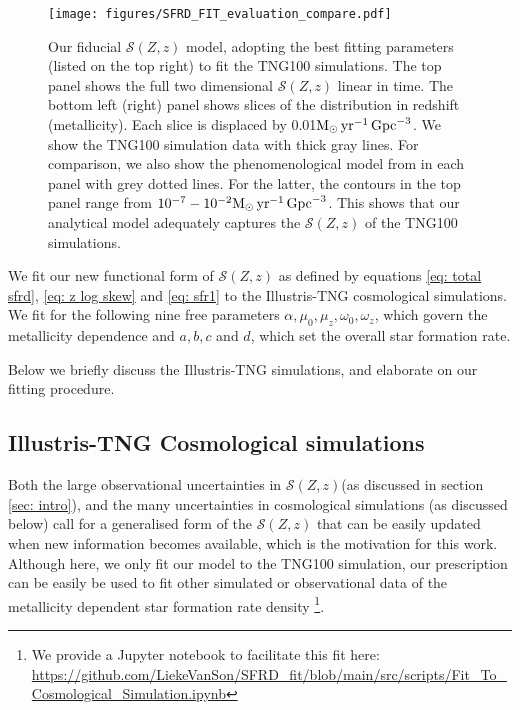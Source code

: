 \documentclass[twocolumn]{aastex631}
\newcommand{\Msun}{\ensuremath{\rm{M}_{\odot}}\xspace}
\newcommand{\yr}{\ensuremath{\,\rm{yr}}\xspace}
\newcommand{\Mpc}{\ensuremath{\,\rm{Gpc}}\xspace}
\newcommand{\SFRDzZ}{\ensuremath{\mathcal{S}(Z,z)}\xspace}
\begin{document}
\begin{figure*}
\centering
{}
\texttt{[image: figures/SFRD\_FIT\_evaluation\_compare.pdf]}
\caption{Our fiducial \SFRDzZ model, adopting the best fitting parameters (listed on the top right) to fit the TNG100 simulations.
The top panel shows the full two dimensional \SFRDzZ linear in time. The bottom left (right) panel shows slices of the distribution in redshift (metallicity). Each slice is displaced by 0.01$\Msun \yr^{-1}\Mpc^{-3}$. We show the TNG100 simulation data with thick gray lines. 
For comparison, we also show the phenomenological model from \protect\cite{Neijssel+2019} in each panel with grey dotted lines. For the latter, the contours in the top panel range from $10^{-7} - 10^{-2} \Msun \yr^{-1}\Mpc^{-3}$. This shows that our analytical model adequately captures the \SFRDzZ of the TNG100 simulations.
 \label{fig: fit SFRD}}
\end{figure*}
We fit our new functional form of \SFRDzZ as defined by equations \ref{eq: total sfrd}, \ref{eq: z log skew} and \ref{eq: sfr1} to the Illustris-TNG cosmological simulations. 
We fit for the following nine free parameters $\alpha, \mu_0, \mu_z, \omega_0, \omega_z$, which govern the metallicity dependence and $a,b, c$ and $d$, which set the overall star formation rate.

Below we briefly discuss the Illustris-TNG simulations, and elaborate on our fitting procedure.




\subsection{Illustris-TNG Cosmological simulations}
Both the large observational uncertainties in \SFRDzZ (as discussed in section \ref{sec: intro}), and the many uncertainties in cosmological simulations (as discussed below) call for a generalised form of the \SFRDzZ that can be easily updated when new information becomes available, which is the motivation for this work. Although here, we only fit our model to the TNG100 simulation, our prescription can be easily be used to fit other simulated or observational data of the metallicity dependent star formation rate density \footnote{We provide a Jupyter notebook to facilitate this fit here: \url{https://github.com/LiekeVanSon/SFRD_fit/blob/main/src/scripts/Fit_To_Cosmological_Simulation.ipynb} }.
\end{document}
